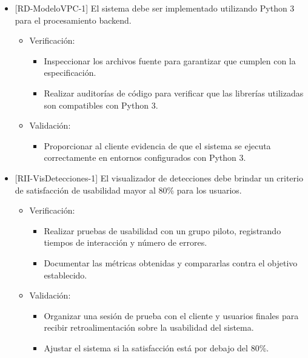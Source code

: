\documentclass[
11pt, %
]{charter}
\begin{document}
\begin{itemize}[label={}]
  \item {[}RD-ModeloVPC-1{]} El sistema debe ser implementado utilizando Python 3 para el procesamiento backend.
        \begin{itemize}
          \item Verificación:
                \begin{itemize}
                  \item Inspeccionar los archivos fuente para garantizar que cumplen con la especificación.
                  \item Realizar auditorías de código para verificar que las librerías utilizadas son compatibles con Python 3.
                \end{itemize}
          \item Validación:
                \begin{itemize}
                  \item Proporcionar al cliente evidencia de que el sistema se ejecuta correctamente en entornos configurados con Python 3.
                \end{itemize}
        \end{itemize}

  \item {[}RII-VisDetecciones-1{]} El visualizador de detecciones debe brindar un criterio de satisfacción de usabilidad mayor al 80\% para los usuarios.
        \begin{itemize}
          \item Verificación:
                \begin{itemize}
                  \item Realizar pruebas de usabilidad con un grupo piloto, registrando tiempos de interacción y número de errores.
                  \item Documentar las métricas obtenidas y compararlas contra el objetivo establecido.
                \end{itemize}
          \item Validación:
                \begin{itemize}
                  \item Organizar una sesión de prueba con el cliente y usuarios finales para recibir retroalimentación sobre la usabilidad del sistema.
                  \item Ajustar el sistema si la satisfacción está por debajo del 80\%.
                \end{itemize}
        \end{itemize}


\end{itemize}
\end{document}
